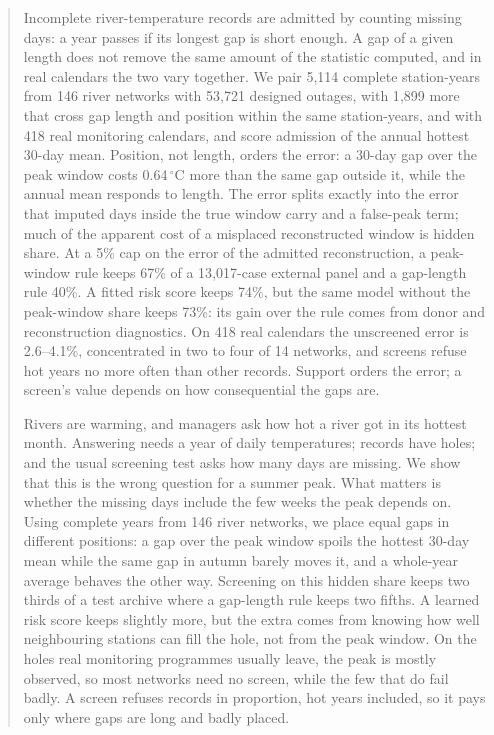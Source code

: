 \documentclass[draft]{agujournal2025}
\begin{document}
\begin{abstract}
Incomplete river-temperature records are admitted by counting missing days: a
year passes if its longest gap is short enough. A gap of a given
length does not remove the same amount of the statistic computed, and in real
calendars the two vary together. We pair 5{,}114 complete station-years from 146
river networks with 53{,}721 designed outages, with 1{,}899 more that
cross gap length and position within the same station-years, and with 418 real
monitoring calendars, and score admission of the annual hottest 30-day mean. Position, not
length, orders the error: a 30-day gap over the peak window costs
0.64\,$^{\circ}$C more than the same gap outside it, while the annual mean
responds to length. The error splits exactly into the error that imputed days
inside the true window carry and a false-peak term; much of the apparent cost of
a misplaced reconstructed window is hidden share. At a 5\% cap on the error of
the admitted reconstruction, a peak-window rule keeps 67\% of a 13{,}017-case
external panel and a gap-length rule 40\%. A fitted risk score keeps 74\%, but
the same model without the peak-window share keeps 73\%: its gain over the rule
comes from donor and reconstruction diagnostics. On 418 real calendars the
unscreened error is 2.6--4.1\%, concentrated in two to four of 14 networks, and screens
refuse hot years no more often than other records. Support orders the error; a
screen's value depends on how consequential the gaps are.
\begin{plainlanguagesummary}
Rivers are warming, and managers ask how hot a river got in its hottest month.
Answering needs a year of daily temperatures; records have holes; and the usual
screening test asks how many days are missing. We show that this is the wrong
question for a summer peak. What matters is whether the missing days include the
few weeks the peak depends on. Using complete years from 146 river networks, we
place equal gaps in different positions: a gap over the peak window
spoils the hottest 30-day mean while the same gap in autumn barely moves it, and
a whole-year average behaves the other way. Screening on this hidden share keeps
two thirds of a test archive where a gap-length rule keeps two fifths. A learned risk score keeps slightly more, but the extra comes from knowing
how well neighbouring stations can fill the hole, not from the peak window. On the
holes real monitoring programmes usually leave, the peak is mostly observed, so
most networks need no screen, while the few that do fail badly. A screen refuses
records in proportion, hot years included, so it pays only where gaps are
long and badly placed.
\end{plainlanguagesummary}
\end{abstract}
\end{document}
